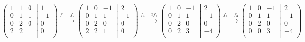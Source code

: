 \documentclass[a4paper,12pt]{article}
\begin{document}
$$
\left ( \left.\begin{matrix}
1 & 1 & 0 \ \\  
0 & 1 & 1 \ \\ 
0 & 2 & 0 \ \\ 
2 & 2 & 1 \ \\
\end{matrix}\right| \begin{matrix}
1 \\ 
-1\\ 
0 \\
0 \\ 
\end{matrix}\right )
\xrightarrow[]{f_1-f_2}
\left ( \left.\begin{matrix}
1 & 0 & -1 \ \\  
0 & 1 & 1 \ \\ 
0 & 2 & 0 \ \\ 
2 & 2 & 1 \ \\
\end{matrix}\right| \begin{matrix}
2 \\ 
-1\\ 
0 \\
0 \\ 
\end{matrix}\right )
\xrightarrow[]{f_4-2f_1}
\left ( \left.\begin{matrix}
1 & 0 & -1 \ \\  
0 & 1 & 1 \ \\ 
0 & 2 & 0 \ \\ 
0 & 2 & 3 \ \\
\end{matrix}\right| \begin{matrix}
2 \\ 
-1\\ 
0 \\
-4 \\ 
\end{matrix}\right )
\xrightarrow[]{f_4-f_3}
\left ( \left.\begin{matrix}
1 & 0 & -1 \ \\  
0 & 1 & 1 \ \\ 
0 & 2 & 0 \ \\ 
0 & 0 & 3 \ \\
\end{matrix}\right| \begin{matrix}
2 \\ 
-1\\ 
0 \\
-4 \\ 
\end{matrix}\right )
$$
\end{document}
